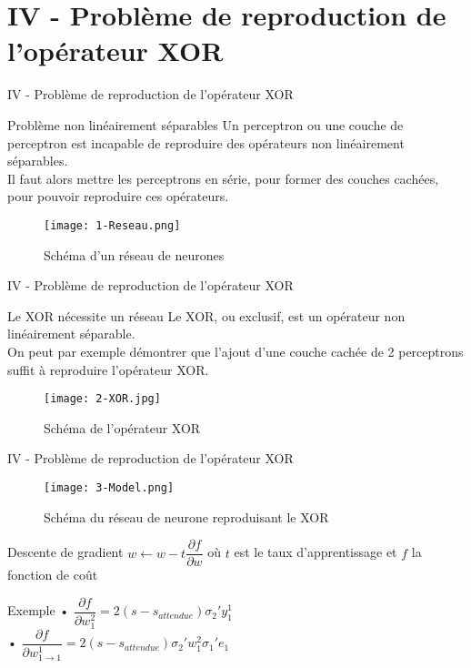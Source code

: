 
\section{IV - Problème de reproduction de l'opérateur XOR}
\begin{frame}{IV - Problème de reproduction de l'opérateur XOR}
\begin{block}{Problème non linéairement séparables}
Un perceptron ou une couche de perceptron est incapable de reproduire des opérateurs non linéairement séparables. \\
Il faut alors mettre les perceptrons en série, pour former des couches cachées, pour pouvoir reproduire ces opérateurs. \\
\end{block}
\begin{figure}
	\centering
    \texttt{[image: 1-Reseau.png]}
	\caption{Schéma d'un réseau de neurones}
\end{figure}
\end{frame}

\begin{frame}{IV - Problème de reproduction de l'opérateur XOR}
\begin{block}{Le XOR nécessite un réseau}
Le XOR, ou exclusif, est un opérateur non linéairement séparable. \\
On peut par exemple démontrer que l'ajout d'une couche cachée de 2 perceptrons suffit à reproduire l'opérateur XOR. \\
\begin{figure}
	\centering
    \texttt{[image: 2-XOR.jpg]}
	\caption{Schéma de l'opérateur XOR}
\end{figure}
\end{block}	
\end{frame}

\begin{frame}{IV - Problème de reproduction de l'opérateur XOR}
\begin{figure}
	\centering
    \texttt{[image: 3-Model.png]}
	\caption{Schéma du réseau de neurone reproduisant le XOR}
\end{figure}
\begin{block}{Descente de gradient}
$w \leftarrow w - t \dfrac{\partial f}{\partial w}$ où $t$ est le taux d'apprentissage et $f$ la fonction de coût
\end{block}
\begin{exampleblock}{Exemple}
• $\dfrac{\partial f}{\partial w^2_1} = 2(s - s_{attendue})\sigma_2 'y^1_1$ \\
• $\dfrac{\partial f}{\partial w^1_{1\to 1}} = 2(s - s_{attendue})\sigma_2 'w^2_1 \sigma _{1} ' e_{1}$
\end{exampleblock}

\end{frame}

